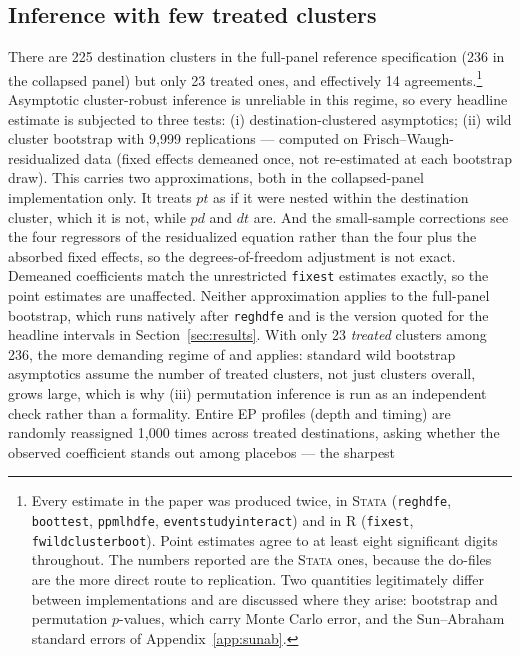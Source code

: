 \documentclass[12pt]{article}
\begin{document}
\subsection{Inference with few treated clusters}

There are 225 destination clusters in the full-panel reference specification (236 in
the collapsed panel) but only 23 treated ones, and effectively 14
agreements.\footnote{Every estimate in the paper was produced twice, in \textsc{Stata}
(\texttt{reghdfe}, \texttt{boottest}, \texttt{ppmlhdfe}, \texttt{eventstudyinteract}) and
in \textsc{R} (\texttt{fixest}, \texttt{fwildclusterboot}). Point estimates agree to at
least eight significant digits throughout. The numbers reported are the \textsc{Stata}
ones, because the do-files are the more direct route to replication. Two quantities
legitimately differ between implementations and are discussed where they arise:
bootstrap and permutation $p$-values, which carry Monte Carlo error, and the
Sun--Abraham standard errors of Appendix~\ref{app:sunab}.} Asymptotic cluster-robust inference is unreliable in this regime, so every
headline estimate is subjected to three tests: (i) destination-clustered asymptotics;
(ii) wild cluster bootstrap with 9{,}999 replications \citep{cameron2008,
fischer2021, roodman2019} --- computed on Frisch--Waugh-residualized data (fixed effects
demeaned once, not re-estimated at each bootstrap draw). This carries two approximations,
both in the collapsed-panel implementation only. It treats $pt$ as if it were nested
within the destination cluster, which it is not, while $pd$ and $dt$ are. And the
small-sample corrections see the four regressors of the residualized equation rather than
the four plus the absorbed fixed effects, so the degrees-of-freedom adjustment is not
exact. Demeaned coefficients match the unrestricted \texttt{fixest} estimates exactly, so
the point estimates are unaffected. Neither approximation applies to the full-panel
bootstrap, which runs natively after \texttt{reghdfe} and is the version quoted for the
headline intervals in Section~\ref{sec:results}. With only 23 \emph{treated} clusters among 236, the more demanding regime of
\citet{mackinnon2017} and \citet{conley2011} applies: standard wild bootstrap asymptotics
assume the number of treated clusters, not just clusters overall, grows large, which is
why (iii) permutation inference \citep{fisher1935} is run as an independent check rather
than a formality. Entire EP profiles
(depth and timing) are randomly reassigned 1{,}000 times across treated destinations,
asking whether the observed coefficient stands out among placebos --- the sharpest
\end{document}
